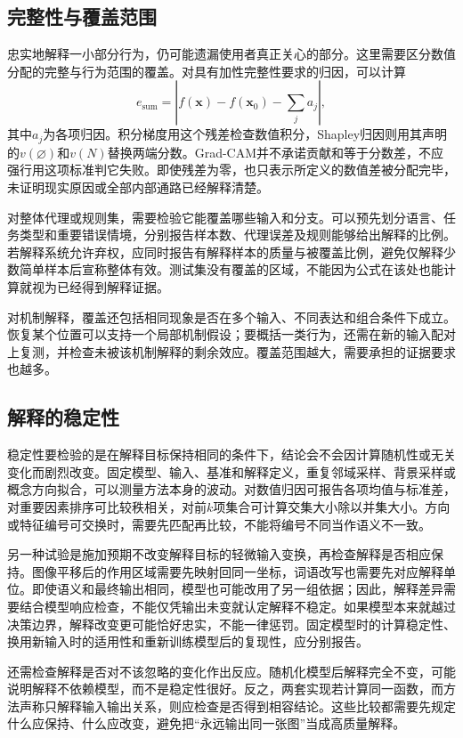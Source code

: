 \subsection{完整性与覆盖范围}
\label{sec:interpretability-quality-coverage}

忠实地解释一小部分行为，仍可能遗漏使用者真正关心的部分。这里需要区分数值分配的完整与行为范围的覆盖。对具有加性完整性要求的归因，可以计算
\[
 e_{\mathrm{sum}}
 =\left|f(\bm{x})-f(\bm{x}_0)-\sum_j a_j\right|,
\]
其中$a_j$为各项归因。积分梯度用这个残差检查数值积分，Shapley归因则用其声明的$v(\varnothing)$和$v(N)$替换两端分数。Grad-CAM并不承诺贡献和等于分数差，不应强行用这项标准判它失败。即使残差为零，也只表示所定义的数值差被分配完毕，未证明现实原因或全部内部通路已经解释清楚。

对整体代理或规则集，需要检验它能覆盖哪些输入和分支。可以预先划分语言、任务类型和重要错误情境，分别报告样本数、代理误差及规则能够给出解释的比例。若解释系统允许弃权，应同时报告有解释样本的质量与被覆盖比例，避免仅解释少数简单样本后宣称整体有效。测试集没有覆盖的区域，不能因为公式在该处也能计算就视为已经得到解释证据。

对机制解释，覆盖还包括相同现象是否在多个输入、不同表达和组合条件下成立。恢复某个位置可以支持一个局部机制假设；要概括一类行为，还需在新的输入配对上复测，并检查未被该机制解释的剩余效应。覆盖范围越大，需要承担的证据要求也越多。

\subsection{解释的稳定性}
\label{sec:interpretability-quality-stability}

稳定性要检验的是在解释目标保持相同的条件下，结论会不会因计算随机性或无关变化而剧烈改变。固定模型、输入、基准和解释定义，重复邻域采样、背景采样或概念方向拟合，可以测量方法本身的波动。对数值归因可报告各项均值与标准差，对重要因素排序可比较秩相关，对前$k$项集合可计算交集大小除以并集大小。方向或特征编号可交换时，需要先匹配再比较，不能将编号不同当作语义不一致。

另一种试验是施加预期不改变解释目标的轻微输入变换，再检查解释是否相应保持。图像平移后的作用区域需要先映射回同一坐标，词语改写也需要先对应解释单位。即使语义和最终输出相同，模型也可能改用了另一组依据；因此，解释差异需要结合模型响应检查，不能仅凭输出未变就认定解释不稳定。如果模型本来就越过决策边界，解释改变更可能恰好忠实，不能一律惩罚。固定模型时的计算稳定性、换用新输入时的适用性和重新训练模型后的复现性，应分别报告。

还需检查解释是否对不该忽略的变化作出反应。随机化模型后解释完全不变，可能说明解释不依赖模型，而不是稳定性很好。反之，两套实现若计算同一函数，而方法声称只解释输入输出关系，则应检查是否得到相容结论。这些比较都需要先规定什么应保持、什么应改变，避免把“永远输出同一张图”当成高质量解释。

